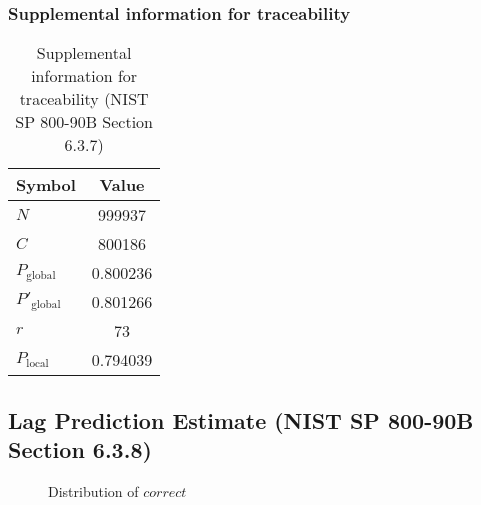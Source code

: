 \documentclass[a3paper,xelatex,english]{bxjsarticle}
\begin{document}
\subsubsection{Supplemental information for traceability}
\renewcommand{\arraystretch}{1.8}
\begin{table}[h]
\caption{Supplemental information for traceability (NIST SP 800-90B Section 6.3.7)}
\begin{center}
\begin{tabular}{|l|c|}
\hline 
\rowcolor{anotherlightblue} %
Symbol				& Value \\ \hline 
$N$				& 999937\\ \hline 
$C$				& 800186\\ \hline 
$P_{\textrm{global}}$				& 0.800236\\ \hline 
$P'_{\textrm{global}}$			& 0.801266\\ \hline 
$r$				& 73\\ \hline 
$P_{\textrm{local}}$ 			& 0.794039\\ \hline
\end{tabular}
\end{center}
\end{table}
\renewcommand{\arraystretch}{1.4}
\clearpage
\subsection{Lag Prediction Estimate (NIST SP 800-90B Section 6.3.8)}
\begin{figure}[htbp]
\caption{Distribution of $correct$}
\end{figure}
\end{document}
